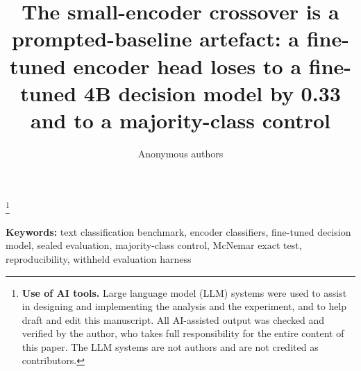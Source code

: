 \documentclass[10pt]{article}
\title{The small-encoder crossover is a prompted-baseline artefact: a fine-tuned encoder head loses to a fine-tuned 4B decision model by 0.33 and to a majority-class control}
\author{Anonymous authors}
\date{}   %
\newcommand\blfootnote[1]{%
  \begingroup
  \renewcommand\thefootnote{}%
  \footnote{#1}%
  \addtocounter{footnote}{-1}%
  \endgroup}
\begin{document}
\maketitle

\blfootnote{\textbf{Use of AI tools.} Large language model (LLM) systems were used to assist in designing and implementing the analysis and the experiment, and to help draft and edit this manuscript. All AI-assisted output was checked and verified by the author, who takes full responsibility for the entire content of this paper. The LLM systems are not authors and are not credited as contributors.}

\noindent\textbf{Keywords:} text classification benchmark, encoder classifiers, fine-tuned decision model, sealed evaluation, majority-class control, McNemar exact test, reproducibility, withheld evaluation harness
\end{document}
